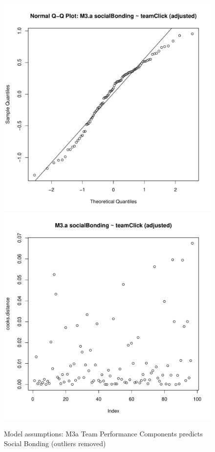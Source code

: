 \begin{figure}[htbp]
        \includegraphics[scale =.4]{images/MLM3aOutQQNorm.pdf}
        \includegraphics[scale =.4]{images/MLM3aOutCooksD.pdf}
        \caption{Model assumptions: M3a Team Performance Components predicts Social Bonding (outliers removed)}
        \label{fig:MLM3aOutAssumptions}
      \end{figure}


